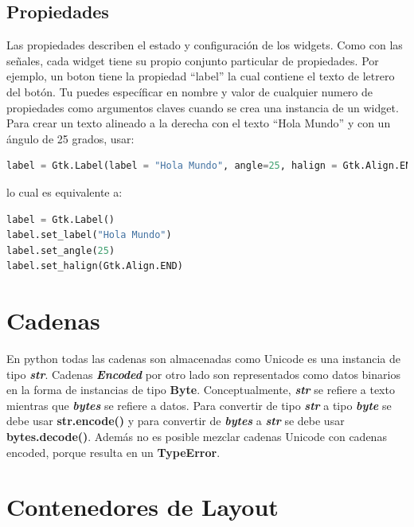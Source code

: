 \documentclass[12pt, twoside]{report}
\begin{document}
\subsection{Propiedades}

Las propiedades describen el estado y configuración de los widgets. Como con las señales, cada widget tiene su propio conjunto particular de propiedades. Por ejemplo, un boton tiene la propiedad ``label'' la cual contiene el texto de letrero del botón. Tu puedes específicar en nombre y valor de cualquier numero de propiedades como argumentos claves cuando se crea una instancia de un widget. Para crear un texto alineado a la derecha con el texto ``Hola Mundo'' y con un ángulo de 25 grados, usar:

\begin{lstlisting}[language=Python]
label = Gtk.Label(label = "Hola Mundo", angle=25, halign = Gtk.Align.END)
\end{lstlisting}

lo cual es equivalente a:

\begin{lstlisting}[language=Python]
label = Gtk.Label()
label.set_label("Hola Mundo")
label.set_angle(25)
label.set_halign(Gtk.Align.END)
\end{lstlisting}

\section{Cadenas}

En python todas las cadenas son almacenadas como Unicode es una instancia de tipo \textit{\textbf{str}}. Cadenas \textit{\textbf{Encoded}} por otro lado son representados como datos binarios en la forma de instancias de tipo \textbf{\textbf{Byte}}. Conceptualmente, \textit{\textbf{str}} se refiere a texto mientras que \textit{\textbf{bytes}} se refiere a datos. Para convertir de tipo \textit{\textbf{str}} a tipo \textit{\textbf{byte}} se debe usar \textbf{str.encode()} y para convertir de \textit{\textbf{bytes}} a \textit{\textbf{str}} se debe usar \textbf{bytes.decode()}.
Además no es posible mezclar cadenas Unicode con cadenas encoded, porque resulta en un \textbf{TypeError}.

\section{Contenedores de Layout}
\end{document}

